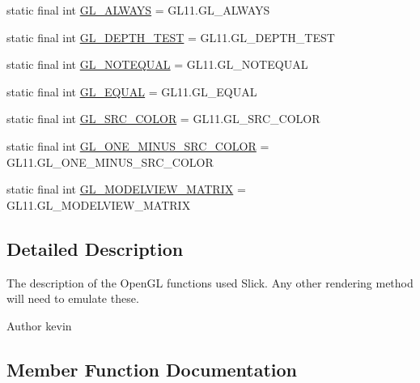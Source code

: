 \begin{DoxyCompactItemize}
static final int \mbox{\hyperlink{interfaceorg_1_1newdawn_1_1slick_1_1opengl_1_1renderer_1_1_s_g_l_a765f0e8e503dc6189be3acfc581515d3}{G\+L\+\_\+\+A\+L\+W\+A\+YS}} = G\+L11.\+G\+L\+\_\+\+A\+L\+W\+A\+YS
\item 
static final int \mbox{\hyperlink{interfaceorg_1_1newdawn_1_1slick_1_1opengl_1_1renderer_1_1_s_g_l_a51ea2813e5347c90317ae89eeab93b31}{G\+L\+\_\+\+D\+E\+P\+T\+H\+\_\+\+T\+E\+ST}} = G\+L11.\+G\+L\+\_\+\+D\+E\+P\+T\+H\+\_\+\+T\+E\+ST
\item 
static final int \mbox{\hyperlink{interfaceorg_1_1newdawn_1_1slick_1_1opengl_1_1renderer_1_1_s_g_l_ae156812bed58a74cccd4d2adc3906f12}{G\+L\+\_\+\+N\+O\+T\+E\+Q\+U\+AL}} = G\+L11.\+G\+L\+\_\+\+N\+O\+T\+E\+Q\+U\+AL
\item 
static final int \mbox{\hyperlink{interfaceorg_1_1newdawn_1_1slick_1_1opengl_1_1renderer_1_1_s_g_l_a70e561cfefb085e0f5d035e7d5e66aa7}{G\+L\+\_\+\+E\+Q\+U\+AL}} = G\+L11.\+G\+L\+\_\+\+E\+Q\+U\+AL
\item 
static final int \mbox{\hyperlink{interfaceorg_1_1newdawn_1_1slick_1_1opengl_1_1renderer_1_1_s_g_l_a8fd65c2c3bca8c3b83cb1b8436a50ad8}{G\+L\+\_\+\+S\+R\+C\+\_\+\+C\+O\+L\+OR}} = G\+L11.\+G\+L\+\_\+\+S\+R\+C\+\_\+\+C\+O\+L\+OR
\item 
static final int \mbox{\hyperlink{interfaceorg_1_1newdawn_1_1slick_1_1opengl_1_1renderer_1_1_s_g_l_a16e57559ba7055f917cbb780159a6df2}{G\+L\+\_\+\+O\+N\+E\+\_\+\+M\+I\+N\+U\+S\+\_\+\+S\+R\+C\+\_\+\+C\+O\+L\+OR}} = G\+L11.\+G\+L\+\_\+\+O\+N\+E\+\_\+\+M\+I\+N\+U\+S\+\_\+\+S\+R\+C\+\_\+\+C\+O\+L\+OR
\item 
static final int \mbox{\hyperlink{interfaceorg_1_1newdawn_1_1slick_1_1opengl_1_1renderer_1_1_s_g_l_a9325428a01b736487dc94933ee76faca}{G\+L\+\_\+\+M\+O\+D\+E\+L\+V\+I\+E\+W\+\_\+\+M\+A\+T\+R\+IX}} = G\+L11.\+G\+L\+\_\+\+M\+O\+D\+E\+L\+V\+I\+E\+W\+\_\+\+M\+A\+T\+R\+IX
\end{DoxyCompactItemize}


\subsection{Detailed Description}
The description of the Open\+GL functions used Slick. Any other rendering method will need to emulate these.

\begin{DoxyAuthor}{Author}
kevin 
\end{DoxyAuthor}


\subsection{Member Function Documentation}
\mbox{\label{interfaceorg_1_1newdawn_1_1slick_1_1opengl_1_1renderer_1_1_s_g_l_a0fc936b77fc280031741e79bd4a290b1}} 
